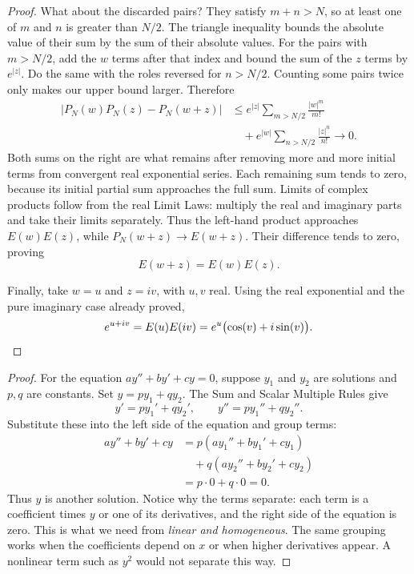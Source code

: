 \begin{proof}
What about the discarded pairs? They satisfy $m+n>N$, so at least
one of $m$ and $n$ is greater than $N/2$. The triangle inequality
bounds the absolute value of their sum by the sum of their absolute
values. For the pairs with $m>N/2$, add the $w$ terms after that index
and bound the sum of the $z$ terms by $e^{|z|}$.
Do the same with the roles reversed for $n>N/2$. Counting some pairs
twice only makes our upper bound larger. Therefore
\begin{align*}
|P_N(w)P_N(z)-P_N(w+z)|
&\leq e^{|z|}\sum_{m>N/2}\frac{|w|^m}{m!}\\
&\quad+e^{|w|}\sum_{n>N/2}\frac{|z|^n}{n!}
\longrightarrow0.
\end{align*}
Both sums on the right are what remains after removing more and more
initial terms from convergent real exponential series. Each remaining
sum tends to zero, because its initial partial sum approaches the full sum.
Limits of complex products follow from the real Limit Laws: multiply
the real and imaginary parts and take their limits separately.
Thus the left-hand product approaches $E(w)E(z)$, while
$P_N(w+z)\to E(w+z)$. Their difference tends to zero, proving
$$E(w+z)=E(w)E(z).$$

Finally, take $w=u$ and $z=iv$, with $u,v$ real. Using the real
exponential and the pure imaginary case already proved,
\[
e^{u+iv}=E(u)E(iv)=e^u\bigl(\cos(v)+i\sin(v)\bigr).
\qedhere
\]
\end{proof}


\begin{proof}
For the equation $ay''+by'+cy=0$, suppose $y_1$ and $y_2$ are solutions
and $p,q$ are constants. Set $y=py_1+qy_2$. The Sum and Scalar Multiple
Rules give
$$
y'=py_1'+qy_2',\qquad y''=py_1''+qy_2''.
$$
Substitute these into the left side of the equation and group terms:
\begin{align*}
ay''+by'+cy
&=p(ay_1''+by_1'+cy_1)\\
&\quad+q(ay_2''+by_2'+cy_2)\\
&=p\cdot0+q\cdot0=0.
\end{align*}
Thus $y$ is another solution. Notice why the terms separate: each term
is a coefficient times $y$ or one of its derivatives, and the right side
of the equation is zero. This is what we need from \textit{linear and
homogeneous}. The same grouping works when the coefficients depend
on $x$ or when higher derivatives appear. A nonlinear term such as
$y^2$ would not separate this way.
\end{proof}

